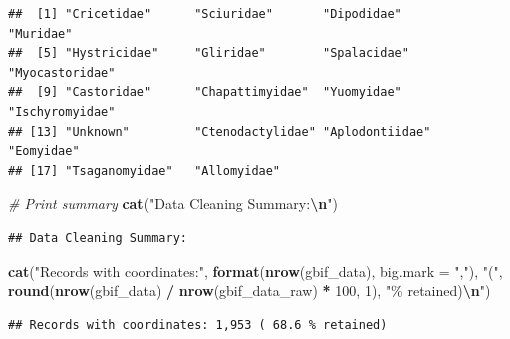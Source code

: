 \documentclass[
]{article}
\newenvironment{Shaded}{\begin{snugshade}}{\end{snugshade}}
\newcommand{\AttributeTok}[1]{\textcolor[rgb]{0.13,0.29,0.53}{#1}}
\newcommand{\CommentTok}[1]{\textcolor[rgb]{0.56,0.35,0.01}{\textit{#1}}}
\newcommand{\DecValTok}[1]{\textcolor[rgb]{0.00,0.00,0.81}{#1}}
\newcommand{\FunctionTok}[1]{\textcolor[rgb]{0.13,0.29,0.53}{\textbf{#1}}}
\newcommand{\NormalTok}[1]{#1}
\newcommand{\SpecialCharTok}[1]{\textcolor[rgb]{0.81,0.36,0.00}{\textbf{#1}}}
\newcommand{\StringTok}[1]{\textcolor[rgb]{0.31,0.60,0.02}{#1}}
\begin{document}
\begin{Shaded}
\end{Shaded}

\begin{verbatim}
##  [1] "Cricetidae"      "Sciuridae"       "Dipodidae"       "Muridae"        
##  [5] "Hystricidae"     "Gliridae"        "Spalacidae"      "Myocastoridae"  
##  [9] "Castoridae"      "Chapattimyidae"  "Yuomyidae"       "Ischyromyidae"  
## [13] "Unknown"         "Ctenodactylidae" "Aplodontiidae"   "Eomyidae"       
## [17] "Tsaganomyidae"   "Allomyidae"
\end{verbatim}

\begin{Shaded}
\begin{Highlighting}[]
\CommentTok{\# Print summary}
\FunctionTok{cat}\NormalTok{(}\StringTok{"Data Cleaning Summary:}\SpecialCharTok{\textbackslash{}n}\StringTok{"}\NormalTok{)}
\end{Highlighting}
\end{Shaded}

\begin{verbatim}
## Data Cleaning Summary:
\end{verbatim}

\begin{Shaded}
\begin{Highlighting}[]
\FunctionTok{cat}\NormalTok{(}\StringTok{"Records with coordinates:"}\NormalTok{, }\FunctionTok{format}\NormalTok{(}\FunctionTok{nrow}\NormalTok{(gbif\_data), }\AttributeTok{big.mark =} \StringTok{","}\NormalTok{),}
    \StringTok{"("}\NormalTok{, }\FunctionTok{round}\NormalTok{(}\FunctionTok{nrow}\NormalTok{(gbif\_data) }\SpecialCharTok{/} \FunctionTok{nrow}\NormalTok{(gbif\_data\_raw) }\SpecialCharTok{*} \DecValTok{100}\NormalTok{, }\DecValTok{1}\NormalTok{), }\StringTok{"\% retained)}\SpecialCharTok{\textbackslash{}n}\StringTok{"}\NormalTok{)}
\end{Highlighting}
\end{Shaded}

\begin{verbatim}
## Records with coordinates: 1,953 ( 68.6 % retained)
\end{verbatim}

\begin{Shaded}
\end{Shaded}
\end{document}
